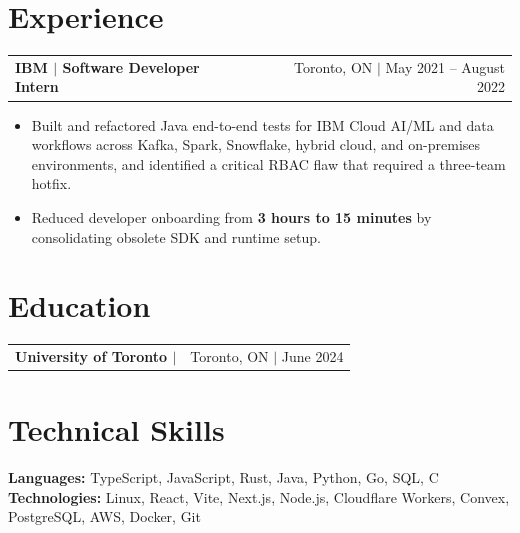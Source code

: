 \documentclass[letterpaper,11pt]{article}
\makeatletter
\newcommand{\resumeHeadingSimple}[2]{%
  \begin{tabularx}{\textwidth}{@{}Xr@{}}
    \textbf{#1} & #2
  \end{tabularx}\vspace{-1pt}
}
\newcommand{\resumeItemListStart}{\begin{itemize}[leftmargin=0.23in,itemsep=0.4pt,parsep=0pt,topsep=0.5pt]}
\newcommand{\resumeItem}[1]{\item\fontsize{9.9pt}{11.1pt}\selectfont #1}
\newcommand{\resumeItemListEnd}{\end{itemize}\vspace{-1.25pt}}
\makeatother
\begin{document}
\section{Experience}
\resumeHeadingSimple
  {IBM $|$ Software Developer Intern}
  {Toronto, ON $|$ May 2021 -- August 2022}
\resumeItemListStart
  \resumeItem{Built and refactored Java end-to-end tests for IBM Cloud AI/ML and data workflows across Kafka, Spark, Snowflake, hybrid cloud, and on-premises environments, and identified a critical RBAC flaw that required a three-team hotfix.}
  \resumeItem{Reduced developer onboarding from \textbf{3 hours to 15 minutes} by consolidating obsolete SDK and runtime setup.}
\resumeItemListEnd

\section{Education}
\resumeHeadingSimple
  {University of Toronto $|$ \normalfont{BSc in Mathematics, Statistics \& Computer Science}}
  {Toronto, ON $|$ June 2024}
\vspace{-3pt}
\section{Technical Skills}
\small
\textbf{Languages:} TypeScript, JavaScript, Rust, Java, Python, Go, SQL, C \quad
\textbf{Technologies:} Linux, React, Vite, Next.js, Node.js, Cloudflare Workers, Convex, PostgreSQL, AWS, Docker, Git
\end{document}
